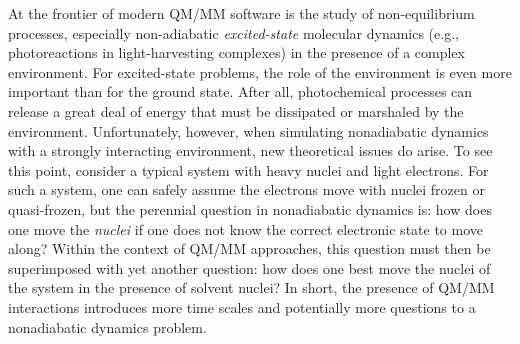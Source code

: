 \documentclass[journal=jctcce,manuscript=article,layout=traditional]{achemso}
\begin{document}
At the frontier of modern QM/MM software is the study of non-equilibrium processes, especially non-adiabatic \textit{excited-state} molecular dynamics (e.g., photoreactions in light-harvesting complexes\cite{Curutchet2017,martinez2021:gfp,zimmer2002:GFPreview,jailaubekov2013hot}) in the presence of a complex environment\cite{barbatti2018:NAQMMMreview}.
For excited-state problems, the role of the environment is even more important than for the ground state. After all,  photochemical processes can release a great deal of energy that must be dissipated or marshaled by the environment.
Unfortunately, however, when simulating nonadiabatic dynamics with a strongly interacting environment, new theoretical issues do arise. To see this point, consider a typical system with heavy nuclei and light electrons. For such a system,  one can safely assume the electrons move with nuclei frozen or quasi-frozen, but the perennial question in nonadiabatic dynamics is: how does one move the {\em nuclei} if one does not know the correct electronic state to move along?  Within the context of QM/MM approaches, this question must then be superimposed with yet another question: how does one best move the nuclei of the system in the presence of solvent nuclei? In short, the presence of QM/MM  interactions introduces more time scales and potentially more questions to a nonadiabatic dynamics problem.  
\end{document}

